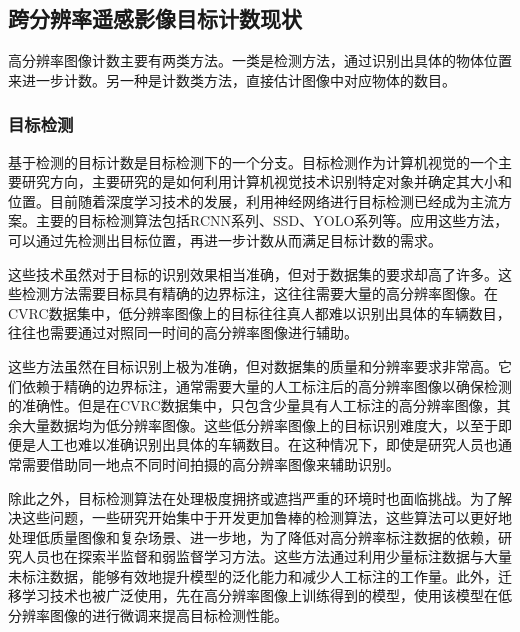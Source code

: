 \subsection{跨分辨率遥感影像目标计数现状}
高分辨率图像计数主要有两类方法。一类是检测方法，通过识别出具体的物体位置来进一步计数。另一种是计数类方法，直接估计图像中对应物体的数目。
\subsubsection{目标检测}
基于检测的目标计数是目标检测下的一个分支。目标检测作为计算机视觉的一个主要研究方向，主要研究的是如何利用计算机视觉技术识别特定对象并确定其大小和位置。目前随着深度学习技术的发展，利用神经网络进行目标检测已经成为主流方案。主要的目标检测算法包括RCNN系列\cite{2014Richfeaturehierarchiesaccurateobjectdetectionsemanticsegmentation}\cite{2015FastRCNN}\cite{2016FasterRCNNRealTimeObjectDetectionRegionProposalNetworks}、SSD\cite{2016SSDSingleShotMultiBoxDetectorb}、YOLO系列\cite{2016YouOnlyLookOnceUnifiedRealTimeObjectDetection}\cite{2016YOLO9000BetterFasterStronger}\cite{2018YOLOv3IncrementalImprovement}等。应用这些方法，可以通过先检测出目标位置，再进一步计数从而满足目标计数的需求。

这些技术虽然对于目标的识别效果相当准确，但对于数据集的要求却高了许多。这些检测方法需要目标具有精确的边界标注，这往往需要大量的高分辨率图像。在CVRC数据集中，低分辨率图像上的目标往往真人都难以识别出具体的车辆数目，往往也需要通过对照同一时间的高分辨率图像进行辅助。

这些方法虽然在目标识别上极为准确，但对数据集的质量和分辨率要求非常高。它们依赖于精确的边界标注，通常需要大量的人工标注后的高分辨率图像以确保检测的准确性。但是在CVRC数据集中，只包含少量具有人工标注的高分辨率图像，其余大量数据均为低分辨率图像。这些低分辨率图像上的目标识别难度大，以至于即便是人工也难以准确识别出具体的车辆数目。在这种情况下，即使是研究人员也通常需要借助同一地点不同时间拍摄的高分辨率图像来辅助识别。

除此之外，目标检测算法在处理极度拥挤或遮挡严重的环境时也面临挑战。为了解决这些问题，一些研究\cite{2023LowResolutionSelfAttentionSemanticSegmentation}开始集中于开发更加鲁棒的检测算法，这些算法可以更好地处理低质量图像和复杂场景、进一步地，为了降低对高分辨率标注数据的依赖，研究人员也在探索半监督和弱监督学习方法\cite{2023SelfsupervisedFewshotLearningSemanticSegmentationAnnotationfreeApproach}。这些方法通过利用少量标注数据与大量未标注数据，能够有效地提升模型的泛化能力和减少人工标注的工作量。此外，迁移学习技术\cite{2021TransferLearningUNetDeepLearningLungUltrasoundSegmentation}也被广泛使用，先在高分辨率图像上训练得到的模型，使用该模型在低分辨率图像的进行微调来提高目标检测性能。



